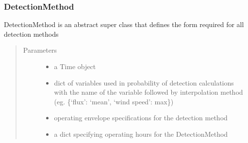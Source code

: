 \documentclass[letterpaper,10pt,english]{sphinxmanual}
\begin{document}
\subsubsection{DetectionMethod}
\label{\detokenize{index:detectionmethod}}

\begin{fulllineitems}
\label{\detokenize{index:feast.DetectionModules.abstract_detection_method.DetectionMethod}}
DetectionMethod is an abstract super class that defines the form required for all detection methods
\begin{quote}\begin{description}
\item[{Parameters}] \leavevmode\begin{itemize}
\item {} 
 \textendash{} a Time object

\item {} 
 \textendash{} dict of variables used in probability of detection calculations with the name of
the variable followed by interpolation method (eg. \{‘flux’: ‘mean’, ‘wind speed’: max\})

\item {} 
 \textendash{} operating envelope specifications for the detection method

\item {} 
 \textendash{} a dict specifying operating hours for the DetectionMethod

\end{itemize}

\end{description}\end{quote}


\end{fulllineitems}
\end{document}
